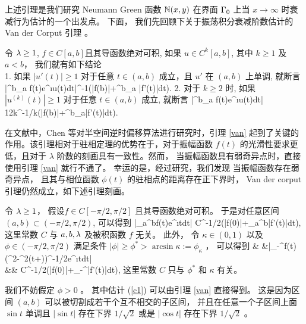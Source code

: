  上述引理是我们研究 Neumann Green 函数 $\mathbb{N}(x,y)$ 在界面 $\Gamma_0$ 上当 $x\to\infty$ 时衰减行为估计的一个出发点。 下面， 我们先回顾下关于振荡积分衰减阶数估计的 Van der Corput 引理 \cite[P.152]{grafakos} 。
 
 \begin{lem}\label{van}
 	令 $\lambda\ge 1$, $f\in C[a,b]$且其导函数绝对可积, 如果 $u\in C^k[a,b]$, 其中 $k\ge 1$ 及 $a<b$， 我们就有如下结论 \\
 	{\rm 1}. 如果 $|u'(t)|\ge 1$ 对于任意 $t\in (a,b)$ 成立，且 $u'$ 在 $(a,b)$ 上单调, 就断言
 	\ben
 	\left|\int^b_a f(t)e^{\i\lambda u(t)}dt\right|\lambda^{-1}\left(|f(b)|+\int^b_a |f'(t)|dt\right).
 	\een
 	{\rm 2}. 对于 $k\geq2$ 时, 如果 $|u^{(k)}(t)|\ge 1$ 对于任意 $t\in (a,b)$ 成立, 就断言 
 	\ben
 	\left|\int^b_a f(t)e^{\i\lambda u(t)}dt\right|\le
 	12k\lambda^{-1/k}\left(|f(b)|+\int^b_a|f'(t)|dt\right).
 	\een
 \end{lem}

在文献\cite{RTMhalf_aco}中，Chen 等对半空间逆时偏移算法进行研究时，引理 \ref{van} 起到了关键的作用。该引理相对于驻相定理的优势在于，对于振幅函数 $f(t)$ 的光滑性要求更低，且对于 $\lambda$ 阶数的刻画具有一致性。然而， 当振幅函数具有弱奇异点时，直接使用引理 \ref{van} 就行不通了。 幸运的是，经过研究，我们发现 当振幅函数存在弱奇异点， 且其与相位函数 $\phi(t)$ 的驻相点的距离存在正下界时， Van der corput 引理仍然成立，如下述引理刻画。


\begin{lem}\label{lem:2.5}
	令 $\lambda\ge 1$， 假设$f\in C[-\pi/2,\pi/2]$ 且其导函数绝对可积。 于是对任意区间 $(a,b)\subset (-\pi/2,\pi/2)$, 可以得到
	\be\label{c1}
	\left|\int_a^bf(t)e^{\i\lam\cos t}dt\right| 
	\leq C\lam^{-1/2}\left(|f(0)|+\int_a^b|f'(t)|dt\right),
	\ee
	这里常数 $C$ 与 $a,b,\lambda$ 及被积函数 $f$ 无关。 
	此外， 令 $\kappa\in (0,1)$ 以及 $\phi\in (-\pi/2,\pi/2)$ 满足条件 $|\phi|\geq\phi^*>\arcsin \kappa:=\phi_\kappa$ ， 可以得到
	\be\label{c3}
	 & &\left|\int_{-\frac{}}^{\frac{}}f(t)(\kappa^2-\sin^2(t+\phi))^{-1/2}e^{\i\lam\cos t}dt\right|  \\ \nn
	&\leq& C\lam^{-1/2}\left(|f(0)|+\int_{-\frac{}}^{\frac {}}|f'(t)|dt\right),
	\ee
	这里常数 $C$ 只与 $\phi^*$ 和 $\kappa$ 有关。
\end{lem}
\debproof
我们不妨假定 $\phi>0$ 。
其中估计 (\ref{c1}) 可以由引理 \ref{van} 直接得到。 这是因为区间 $(a,b)$ 可以被切割成若干个互不相交的子区间， 并且在任意一个子区间上面 $\sin t$ 单调且 $|\sin t|$ 存在下界 $1/\sqrt 2$ 或是 $|\cos t|$ 存在下界 $1/\sqrt 2$ 。

